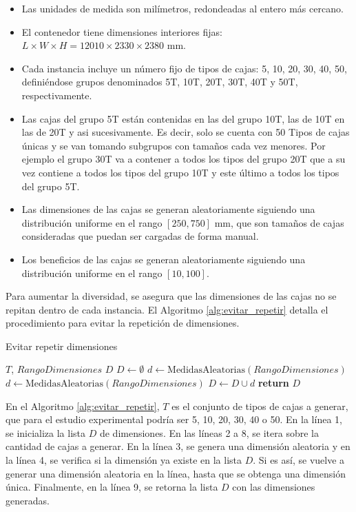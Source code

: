 \documentclass[openany]{article}
\begin{document}
\begin{itemize}
    \item Las unidades de medida son milímetros, redondeadas al entero más cercano.
    \item El contenedor tiene dimensiones interiores fijas: $L \times W \times H = 12010 \times 2330 \times 2380$ mm.
    \item Cada instancia incluye un número fijo de tipos de cajas: 5, 10, 20, 30, 40, 50, definiéndose grupos denominados 5T, 10T, 20T, 30T, 40T y 50T, respectivamente.
    \item Las cajas del grupo 5T están contenidas en las del grupo 10T, las de 10T en las de 20T y asi sucesivamente. Es decir, solo se cuenta con 50 Tipos de cajas únicas y se van tomando subgrupos con tamaños cada vez menores. Por ejemplo el grupo 30T va a contener a todos los tipos del grupo 20T que a su vez contiene a todos los tipos del grupo 10T y este último a todos los tipos del grupo 5T.
    \item Las dimensiones de las cajas se generan aleatoriamente siguiendo una distribución uniforme en el rango $[250, 750]$ mm, que son tamaños de cajas consideradas que puedan ser cargadas de forma manual.
    \item Los beneficios de las cajas se generan aleatoriamente siguiendo una distribución uniforme en el rango $[10, 100]$.
\end{itemize}

Para aumentar la diversidad, se asegura que las dimensiones de las cajas no se repitan dentro de cada instancia. El Algoritmo \ref{alg:evitar_repetir} detalla el procedimiento para evitar la repetición de dimensiones.

\begin{algorithm}[H]
    \caption{Evitar repetir dimensiones}
    \label{alg:evitar_repetir}
    \begin{algorithmic}[1]
        \Require $T$, $RangoDimensiones$
        \Ensure $D$
        \State $D \gets \emptyset$
        \State $d \gets \text{MedidasAleatorias}(RangoDimensiones)$
        \State $d \gets \text{MedidasAleatorias}(RangoDimensiones)$
        \EndWhile
        \State $D \gets D \cup d$
        \EndFor
        \State \textbf{return} $D$
    \end{algorithmic}
\end{algorithm}

En el Algoritmo \ref{alg:evitar_repetir}, $T$ es el conjunto de tipos de cajas a generar, que para el estudio experimental podría ser 5, 10, 20, 30, 40 o 50. En la línea 1, se inicializa la lista $D$ de dimensiones. En las líneas 2 a 8, se itera sobre la cantidad de cajas a generar. En la línea 3, se genera una dimensión aleatoria y en la línea 4, se verifica si la dimensión ya existe en la lista $D$. Si es así, se vuelve a generar una dimensión aleatoria en la línea, hasta que se obtenga una dimensión única. Finalmente, en la línea 9, se retorna la lista $D$ con las dimensiones generadas.
\end{document}
